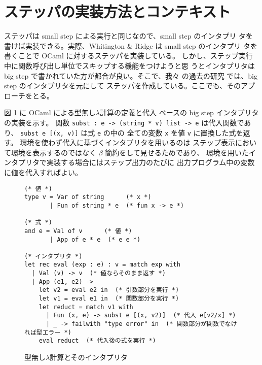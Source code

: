 \section{ステッパの実装方法とコンテキスト}
\label{section:context}

ステッパは small step による実行と同じなので、small step のインタプリ
タを書けば実装できる。実際、Whitington \& Ridge \cite{EPTCS294.3} は small step のインタプリ
タを書くことで OCaml に対するステッパを実装している。
しかし、ステップ実行中に関数呼び出し単位でスキップする機能をつけようと思
うとインタプリタは big step で書かれていた方が都合が良い。そこで、我々
の過去の研究 \cite{FCA19} では、big step のインタプリタを元にして
ステッパを作成している。ここでも、そのアプローチをとる。

図 \ref{figure:lambda} に OCaml による型無し$\lambda$計算の定義と代入
ベースの big step インタプリタの実装を示す。
関数 \texttt{subst :\ e -> (string * v) list -> e} は代入関数であり、
\texttt{subst e [(x, v)]} は式 \texttt{e} の中の
全ての変数 \texttt{x} を値 \texttt{v} に置換した式を返す。
環境を使わず代入に基づくインタプリタを用いるのは
ステップ表示において環境を表示するのではなく $\beta$ 簡約をして見せるためであり、
環境を用いたインタプリタで実装する場合にはステップ出力のたびに
出力プログラム中の変数に値を代入すればよい。



\begin{figure}
\begin{verbatim}
(* 値 *)
type v = Var of string      (* x *)
       | Fun of string * e  (* fun x -> e *)

(* 式 *)
and e = Val of v      (* 値 *)
       | App of e * e  (* e e *)

(* インタプリタ *)
let rec eval (exp : e) : v = match exp with
  | Val (v) -> v  (* 値ならそのまま返す *)
  | App (e1, e2) ->
    let v2 = eval e2 in  (* 引数部分を実行 *)
    let v1 = eval e1 in  (* 関数部分を実行 *)
    let reduct = match v1 with
      | Fun (x, e) -> subst e [(x, v2)]  (* 代入 e[v2/x] *)
      | _ -> failwith "type error" in  (* 関数部分が関数でなければ型エラー *)
    eval reduct  (* 代入後の式を実行 *)
\end{verbatim}
\caption{型無し$\lambda$計算とそのインタプリタ}
\label{figure:lambda}
\end{figure}

